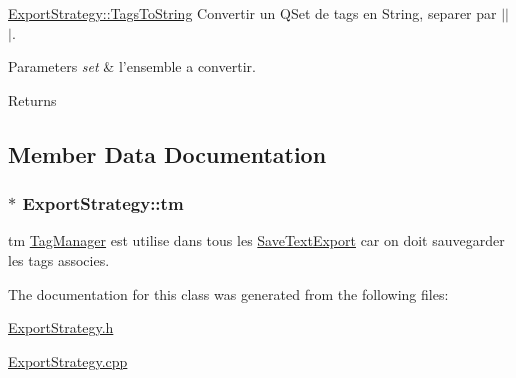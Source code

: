\hyperlink{class_export_strategy_a6822e5b6ea45acf832e2e0eada6c99d5}{Export\-Strategy\-::\-Tags\-To\-String} Convertir un Q\-Set de tags en String, separer par $|$$|$$|$. 


\begin{DoxyParams}{Parameters}
{\em set} & l'ensemble a convertir. \\
\hline
\end{DoxyParams}
\begin{DoxyReturn}{Returns}

\end{DoxyReturn}


\subsection{Member Data Documentation}
\hypertarget{class_export_strategy_a3f094241c5837c51e89d6aef2daf7be6}{
\subsubsection[{tm}]{$\ast$ Export\-Strategy\-::tm\hspace{0.3cm}{\ttfamily [protected]}}}\label{class_export_strategy_a3f094241c5837c51e89d6aef2daf7be6}


tm \hyperlink{class_tag_manager}{Tag\-Manager} est utilise dans tous les \hyperlink{class_save_text_export}{Save\-Text\-Export} car on doit sauvegarder les tags associes. 



The documentation for this class was generated from the following files\-:\begin{DoxyCompactItemize}
\item 
\hyperlink{_export_strategy_8h}{Export\-Strategy.\-h}\item 
\hyperlink{_export_strategy_8cpp}{Export\-Strategy.\-cpp}\end{DoxyCompactItemize}
